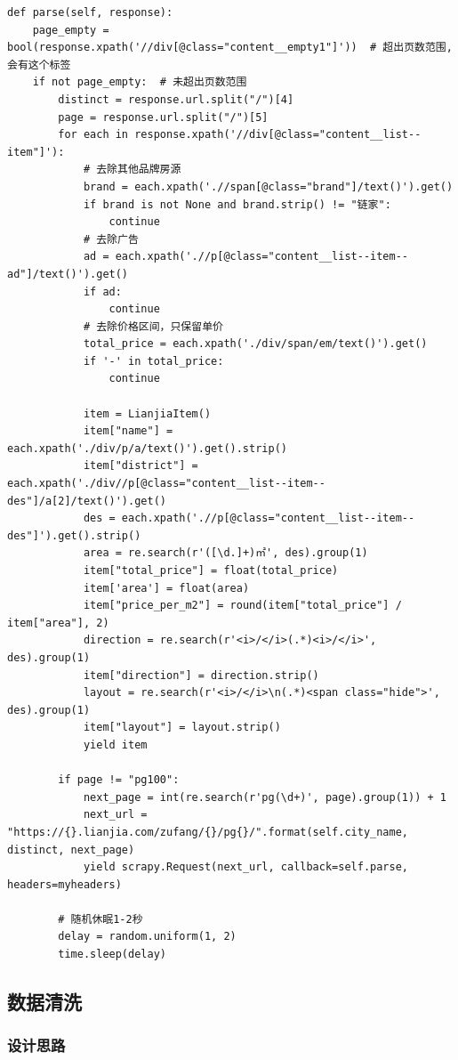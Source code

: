 \documentclass[lang=cn,11pt,a4paper]{elegantpaper}
\begin{document}
\begin{lstlisting}
def parse(self, response):
    page_empty = bool(response.xpath('//div[@class="content__empty1"]'))  # 超出页数范围,会有这个标签
    if not page_empty:  # 未超出页数范围
        distinct = response.url.split("/")[4]
        page = response.url.split("/")[5]
        for each in response.xpath('//div[@class="content__list--item"]'):
            # 去除其他品牌房源
            brand = each.xpath('.//span[@class="brand"]/text()').get()
            if brand is not None and brand.strip() != "链家":
                continue
            # 去除广告
            ad = each.xpath('.//p[@class="content__list--item--ad"]/text()').get()
            if ad:
                continue
            # 去除价格区间，只保留单价
            total_price = each.xpath('./div/span/em/text()').get()
            if '-' in total_price:
                continue

            item = LianjiaItem()
            item["name"] = each.xpath('./div/p/a/text()').get().strip()
            item["district"] = each.xpath('./div//p[@class="content__list--item--des"]/a[2]/text()').get()
            des = each.xpath('.//p[@class="content__list--item--des"]').get().strip()
            area = re.search(r'([\d.]+)㎡', des).group(1)
            item["total_price"] = float(total_price)
            item['area'] = float(area)
            item["price_per_m2"] = round(item["total_price"] / item["area"], 2)
            direction = re.search(r'<i>/</i>(.*)<i>/</i>', des).group(1)
            item["direction"] = direction.strip()
            layout = re.search(r'<i>/</i>\n(.*)<span class="hide">', des).group(1)
            item["layout"] = layout.strip()
            yield item

        if page != "pg100":
            next_page = int(re.search(r'pg(\d+)', page).group(1)) + 1
            next_url = "https://{}.lianjia.com/zufang/{}/pg{}/".format(self.city_name, distinct, next_page)
            yield scrapy.Request(next_url, callback=self.parse, headers=myheaders)

        # 随机休眠1-2秒
        delay = random.uniform(1, 2)
        time.sleep(delay)
\end{lstlisting}



\subsection{数据清洗}

\subsubsection{设计思路}
\end{document}

